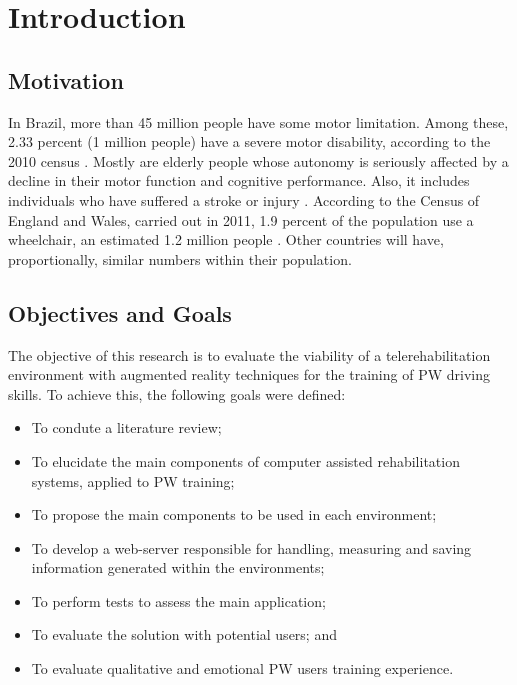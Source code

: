 \chapter{Introduction}


\section{Motivation}
\label{sec:motivation}

In Brazil, more than 45 million people have some motor limitation. Among these, 2.33 percent (1 million people) have a severe motor disability, according to the 2010 census \cite{gonzaga2023}. Mostly are elderly people whose autonomy is seriously affected by a decline in their motor function and cognitive performance. Also, it includes individuals who have suffered a stroke or injury \cite{gonzaga2023}. According to the Census of England and Wales, carried out in 2011, 1.9 percent of the population use a wheelchair, an estimated 1.2 million people \cite{gonzaga2023}. Other countries will have, proportionally, similar numbers within their population.



\section{Objectives and Goals}

The objective of this research is to evaluate the viability of a telerehabilitation environment with augmented reality techniques for the training of PW driving skills. To achieve this, the following goals were defined:
\begin{itemize}
\item To condute a literature review;
\item To elucidate the main components of computer assisted rehabilitation systems, applied to PW training;
\item To propose the main components to be used in each environment;
\item To develop a web-server responsible for handling, measuring and saving information generated within the environments;
\item To perform tests to assess the main application;
\item To evaluate the solution with potential users; and
\item To evaluate qualitative and emotional PW users training experience.
\end{itemize}

